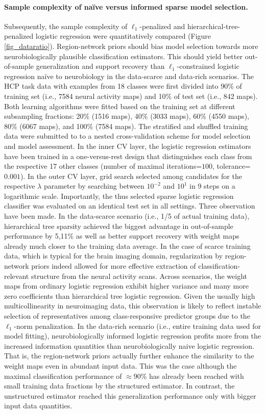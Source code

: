 \documentclass{article} %
\begin{document}
\paragraph{Sample complexity of na\"ive versus informed sparse model selection.}
Subsequently, the sample complexity of
$\ell_1$-penalized and hierarchical-tree-penalized logistic regression
were quantitatively compared (Figure \ref{fig_dataratio}).
Region-network priors should bias model selection towards more
neurobiologically plausible classification estimators.
This should yield better out-of-sample generalization and
support recovery than
$\ell_1$-constrained logistic regression na\"ive to neurobiology
in the data-scarce and data-rich scenarios.
%
The HCP task data with examples from 18 classes were first divided into
90\% of training set (i.e., 7584 neural activity maps) and
10\% of test set (i.e., 842 maps).
Both learning algorithms were fitted based on the
training set at different subsampling fractions:
20\% (1516 maps),
40\% (3033 maps),
60\% (4550 maps),
80\% (6067 maps), and
100\% (7584 maps).
The stratified and shuffled training data were submitted to
to a nested cross-validation scheme
for model selection and model assessment.
In the inner CV layer, the logistic regression estimators
have been trained in a one-versus-rest design that
distinguishes each class from
the respective 17 other classes
(number of maximal iterations=$100$, tolerance=$0.001$).
In the outer CV layer, grid search
selected among candidates for the respective $\lambda$ parameter
by searching between $10^{-2}$ and $10^{1}$ in 9 steps on a logarithmic scale.
Importantly, the thus selected sparse logistic regression classifier was
evaluated on an identical test set in all settings.
%
Three observation have been made.
In the data-scarce scenario (i.e., 1/5 of actual training data),
hierarchical tree sparsity achieved the biggest advantage
in out-of-sample performance by 5,11\% as well as
better support recovery with weight maps already much closer
to the training data average.
In the case of scarce training data, which is typical for the brain imaging domain,
regularization by region-network priors indeed allowed for
more effective extraction of classification-relevant structure
from the neural activity scans.
%
Across scenarios,
the weight maps from ordinary logistic regression exhibit
higher variance and many more zero coefficients
than hierarchical tree logistic regression.
Given the usually high multicollinearity in neuroimaging data,
this observation is likely to reflect instable selection of
representatives among class-responsive predictor groups
due to the $\ell_1$-norm penalization.
%
In the data-rich scenario (i.e., entire training data used for model fitting),
neurobiologically informed logistic regression
profits more from the increased information quantities than
neurobiologically naive logistic regression.
That is, the region-network priors actually further enhance the similarity
to the weight maps even in abundant input data.
This was the case although
the maximal classification performance of $\approx$90\% has already
been reached with small training data fractions by the structured estimator.
In contrast, 
the unstructured estimator reached this generalization performance
only with bigger input data quantities.
\end{document}
